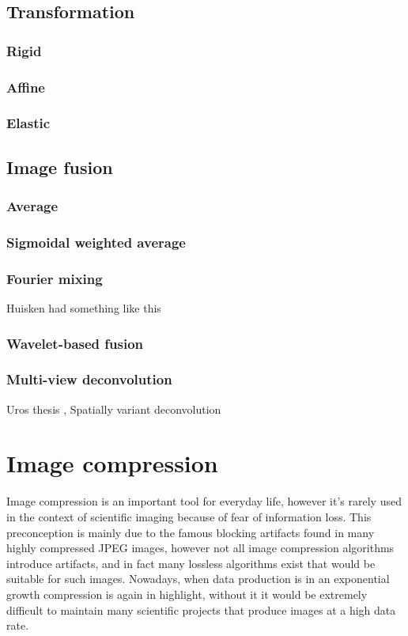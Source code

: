   \subsection{Transformation}
    \subsubsection{Rigid}
    \subsubsection{Affine}
    \subsubsection{Elastic}
  \subsection{Image fusion}
      \subsubsection{Average}
    \subsubsection{Sigmoidal weighted average}
    \subsubsection{Fourier mixing}
    Huisken had something like this
    \subsubsection{Wavelet-based fusion}
    \subsubsection{Multi-view deconvolution}
    
    \cite{krzic_multiple-view_2009} Uros thesis
    \cite{temerinac-ott_multiview_2012}, \cite{temerinac-ott_spatially-variant_2011} Spatially variant deconvolution



\section{Image compression}
  Image compression is an important tool for everyday life, however it's rarely used in the context of scientific imaging because of fear of information loss. This preconception is mainly due to the famous blocking artifacts found in many highly compressed JPEG images, however not all image compression algorithms introduce artifacts, and in fact many lossless algorithms exist that would be suitable for such images. Nowadays, when data production is in an exponential growth compression is again in highlight, without it it would be extremely difficult to maintain many scientific projects that produce images at a high data rate. 

